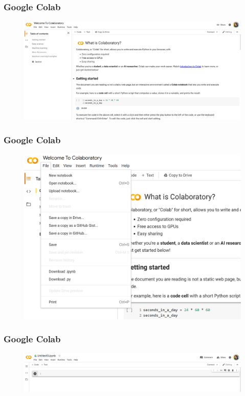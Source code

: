 \documentclass[10pt]{beamer}
\begin{document}
\begin{frame}[fragile]
\frametitle{Google Colab}
\begin{figure}
\includegraphics[width=1\textwidth]{GColab01.png}
\end{figure}
\end{frame}

\begin{frame}[fragile]
\frametitle{Google Colab}
\begin{figure}
\includegraphics[width=1\textwidth]{GColab02.png}
\end{figure}
\end{frame}

\begin{frame}[fragile]
\frametitle{Google Colab}
\begin{figure}
\includegraphics[width=1\textwidth]{GColab03.png}
\end{figure}
\end{frame}
\end{document}
